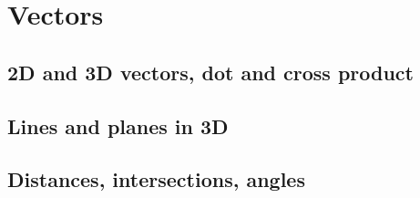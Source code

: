 
\section{Vectors}

\subsection{2D and 3D vectors, dot and cross product}


\subsection{Lines and planes in 3D}


\subsection{Distances, intersections, angles}


